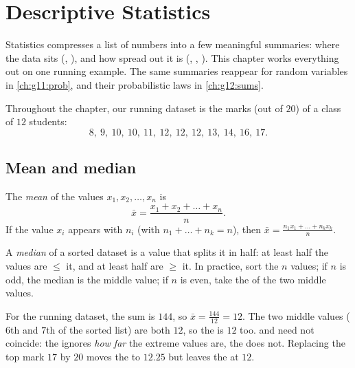 \chapter{Descriptive Statistics}\label{ch:g11:stat}

Statistics compresses a list of numbers into a few meaningful summaries:
where the data sits (, ), and how spread out it is (,
, ). This chapter works everything out on one
running example. The same summaries reappear for random variables in
\cref{ch:g11:prob}, and their probabilistic laws in \cref{ch:g12:sums}.

Throughout the chapter, our running dataset is the marks (out of $20$) of
a class of $12$ students:
\[
8,\ 9,\ 10,\ 10,\ 11,\ 12,\ 12,\ 12,\ 13,\ 14,\ 16,\ 17 .
\]

\section{Mean and median}

\begin{definition}[Mean]\label{def:g11:stat:mean}
The \emph{mean} of the values $x_1, x_2, \dots, x_n$ is
\[
\bar x = \frac{x_1 + x_2 + \dots + x_n}{n}.
\]
If the value $x_i$ appears with  $n_i$ (with
$n_1 + \dots + n_k = n$), then
$\bar x = \frac{n_1 x_1 + \dots + n_k x_k}{n}$.
\end{definition}

\begin{definition}[Median]\label{def:g11:stat:median}
A \emph{median} of a sorted dataset is a value that splits
it in half: at least half the values are $\leq$ it, and at least half are
$\geq$ it. In practice, sort the $n$ values; if $n$ is odd, the median is
the middle value; if $n$ is even, take the  of the two middle
values.
\end{definition}

\begin{example}\label{ex:g11:stat:meanmedian}
For the running dataset, the sum is $144$, so $\bar x = \frac{144}{12} =
12$. The two middle values ($6$th and $7$th of the sorted list) are both
$12$, so the  is $12$ too.  and  need not coincide: the
 ignores \emph{how far} the extreme values are, the  does not.
Replacing the top mark $17$ by $20$ moves the  to $12.25$ but leaves
the  at $12$.
\end{example}

